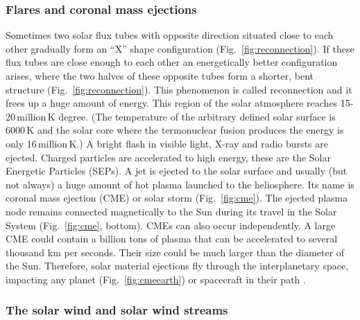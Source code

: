 \documentclass[sn-aps]{sn-jnl}%
\begin{document}
\subsubsection{Flares and coronal mass ejections}
\label{sec:cme}

Sometimes two solar flux tubes with opposite direction situated close to each other gradually form an ``X'' shape configuration (Fig.~\ref{fig:reconnection}). If these flux tubes are close enough to each other an energetically better configuration arises, where the two halves of these opposite tubes form a shorter, bent structure (Fig.~\ref{fig:reconnection}). This phenomenon is called reconnection and it frees up a huge amount of energy.  This region of the solar atmosphere reaches 15-20\,million\,K degree. (The temperature of the arbitrary defined solar surface is 6000\,K and the solar core where the termonuclear fusion produces the energy is only 16\,million\,K.) A bright flash in visible light, X-ray and radio bursts are ejected. Charged particles are accelerated to high energy, these are the Solar Energetic Particles (SEPs). A jet is ejected to the solar surface and usually (but not always) a huge amount of hot plasma launched to the heliosphere. Its name is coronal mass ejection (CME) or solar storm (Fig.~\ref{fig:cme}). The ejected plasma node remains connected magnetically to the Sun during its travel in the Solar System (Fig.~\ref{fig:cme}, bottom). CMEs can also occur independently. A large CME could contain a billion tons of plasma that can be accelerated to several thousand km per seconds. Their size could be much larger than the diameter of the Sun. Therefore, solar material ejections fly through the interplanetary space, impacting any planet (Fig.~\ref{fig:cmeearth}) or spacecraft in their path \cite{scherer05:_space_weath,stix04:_sun_introd}.

\subsubsection{The solar wind and solar wind streams}
\label{sec:sw}
\end{document}
